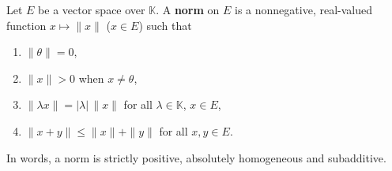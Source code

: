 Let $E$ be a vector space over $\mathbb{K}$. A \textbf{norm} on $E$ is a nonnegative, real-valued function $x \mapsto \|x\|$ ($x \in E$) such that
\begin{enumerate}
\item[(i)] $\|\theta\| = 0$,
\item[(ii)] $\|x\| > 0$ when $x \neq \theta$,
\item[(iii)] $\|\lambda x\| = |\lambda| \, \|x\|$ for all $\lambda \in \mathbb{K}$, $x \in E$,
\item[(iv)] $\|x + y\| \leq \|x\| + \|y\|$ for all $x, y \in E$.
\end{enumerate}
In words, a norm is strictly positive, absolutely homogeneous and subadditive.
